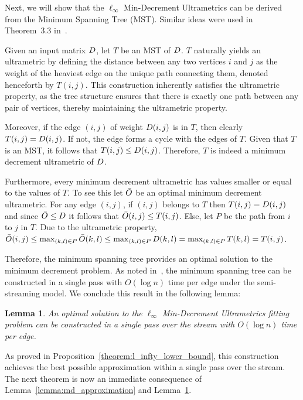 \documentclass{article}
\newtheorem{lemma}[theorem]{Lemma}
\begin{document}
Next, we will show that the  $\ell_\infty$ Min-Decrement Ultrametrics can be derived from the Minimum Spanning Tree (MST). Similar ideas were used in Theorem~3.3 in~\cite{agarwala}.

Given an input matrix $D$, let $T$ be an MST of $D$.
$T$ naturally yields an ultrametric by defining the distance between any two vertices $i$ and $j$ as the weight of the heaviest edge on the unique path connecting them, denoted henceforth by $T ({i,j})$.
This construction inherently satisfies the ultrametric property, as the tree structure ensures that there is exactly one path between any pair of vertices, thereby maintaining the ultrametric property.

Moreover, if the edge $(i,j)$ of weight $D (i,j)$ is in $T$, then clearly $T ({i,j})=D (i,j)$. If not, the edge forms a cycle with the edges of $T$. Given that $T$ is an MST, it follows that $T ({i,j}) \leq D (i,j)$. Therefore, $T$ is indeed a minimum decrement ultrametric of $D$.

Furthermore, every minimum decrement ultrametric has values smaller or equal to the values of $T$. 
To see this let $\bar{O}$ be an optimal minimum decrement ultrametric. For any edge $(i,j)$, if $(i,j)$ belongs to $T$ then $T ({i,j})=D (i,j)$ and since $\bar{O} \leq D$ it follows that $\bar{O} ({i,j}) \leq T ({i,j})$. Else, let $P$ be the path from $i$ to $j$ in $T$. Due to the ultrametric property, $\bar{O} ({i,j}) \leq \max_{(k,l)\in P} \bar{O} ({k,l}) \leq 
\max_{(k,l)\in P} D ({k,l}) = \max_{(k,l)\in P} T ({k,l}) = T ({i,j})$.

Therefore, the minimum spanning tree provides an optimal solution to the minimum decrement problem. 
As noted in~\cite{feigenbaum2005graph}, the minimum spanning tree can be constructed in a single pass with $O(\log n)$ time per edge under the semi-streaming model. We conclude this result in the following lemma:

\begin{lemma}\label{lemma:optimal_md}
An optimal solution to the $\ell_\infty$ Min-Decrement Ultrametrics fitting problem can be constructed in a single pass over the stream with $O(\log n)$ time per edge.
\end{lemma}

As proved in Proposition~\ref{theorem:l_infty_lower_bound},
this construction achieves the best possible approximation within a single pass over the stream.
The next theorem is now an immediate consequence of Lemma~\ref{lemma:md_approximation} and Lemma~\ref{lemma:optimal_md}.
\end{document}
